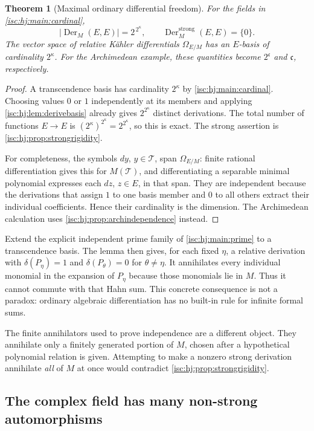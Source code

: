 \documentclass[11pt,letterpaper]{article}
\newtheorem{theorem}{Theorem}[section]
\theoremstyle{definition}
\theoremstyle{remark}
\newcommand{\cc}{\mathfrak c}
\numberwithin{equation}{section}
\begin{document}
\begin{theorem}[Maximal ordinary differential freedom]\label{isc:hj:thm:derivations}
For the fields in \cref{isc:hj:main:cardinal},
\[
 |\operatorname{Der}_M(E,E)|=2^{\,2^\kappa},
 \qquad
 \operatorname{Der}^{\mathrm{strong}}_M(E,E)=\{0\}.
\]
The vector space of relative K\"ahler differentials $\Omega_{E/M}$ has
an $E$-basis of cardinality $2^\kappa$. For the Archimedean example,
these quantities become $2^{\cc}$ and $\cc$, respectively.
\end{theorem}
\begin{proof}
A transcendence basis has cardinality $2^\kappa$ by
\cref{isc:hj:main:cardinal}. Choosing values $0$ or $1$ independently at its
members and applying \cref{isc:hj:lem:derivebasis} already gives
$2^{2^\kappa}$ distinct derivations. The total number of functions
$E\to E$ is
$(2^\kappa)^{2^\kappa}=2^{2^\kappa}$, so this is exact.
The strong assertion is \cref{isc:hj:prop:strongrigidity}.

For completeness, the symbols $dy$, $y\in\mathcal T$, span $\Omega_{E/M}$:
finite rational differentiation gives this for $M(\mathcal T)$, and
differentiating a separable minimal polynomial expresses each $dz$,
$z\in E$, in that span. They are independent because the derivations that
assign $1$ to one basis member and $0$ to all others extract their
individual coefficients. Hence their cardinality is the dimension.
The Archimedean calculation uses \cref{isc:hj:prop:archindependence}
instead.
\end{proof}

Extend the explicit independent prime family of \cref{isc:hj:main:prime}
to a transcendence basis. The lemma then gives, for each fixed $\eta$, a
relative derivation with $\delta(P_\eta)=1$ and $\delta(P_\theta)=0$ for
$\theta\ne\eta$. It annihilates every individual monomial in the
expansion of $P_\eta$ because those monomials lie in $M$. Thus it cannot
commute with that Hahn sum. This concrete consequence is not a paradox:
ordinary algebraic differentiation has no built-in rule for infinite
formal sums.

The finite annihilators used to prove independence are a different
object. They annihilate only a finitely generated portion of $M$,
chosen after a hypothetical polynomial relation is given. Attempting to
make a nonzero strong derivation annihilate \emph{all} of $M$ at once
would contradict \cref{isc:hj:prop:strongrigidity}.

\subsection{The complex field has many non-strong automorphisms}
\end{document}
